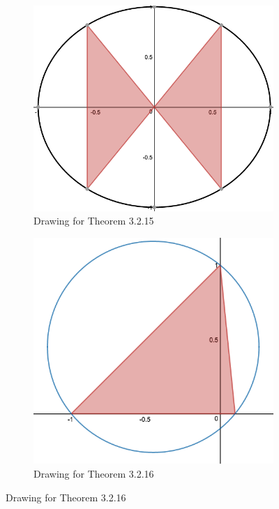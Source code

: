 \documentclass[crop=false,class=book,oneside]{standalone}
\begin{document}
            \begin{figure}[H]
              \begin{subfigure}[b]{0.49\textwidth}
                 \centering
                \includegraphics[width=\textwidth]{Circles-3.png}
                \caption{Drawing for Theorem 3.2.15}
              \end{subfigure}
              \begin{subfigure}[b]{0.49\textwidth}
                \centering
                \includegraphics[width=\textwidth]{Circle-4.png}
                \caption{Drawing for Theorem 3.2.16}
              \end{subfigure}
            \end{figure}
\end{document}
